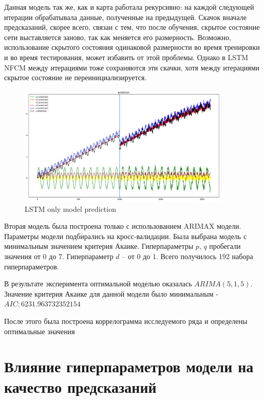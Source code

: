 Данная модель так же, как и карта работала рекурсивно:
на каждой следующей итерации обрабатывала данные, полученные на предыдущей.
Скачок вначале предсказаний, скорее всего, связан с тем, что после обучения,
скрытое состояние сети выставляется заново, так как меняется его размерность.
Возможно, использование скрытого состояния одинаковой размерности во время
тренировки и во время тестирования, может избавить от этой проблемы. Однако
в LSTM NFCM между итерациями тоже сохраняются эти скачки, хотя между итерациями
скрытое состояние не переинициализируется.

\begin{figure}
	\centering
	\includegraphics[width=0.9\textwidth]{./img/lstm_only_prediction.png}
	\caption{LSTM only model prediction}
	\label{pic:lstm_only_prediction}
\end{figure}


Вторая модель была построена только с использованием ARIMAX модели.
Параметры модели подбирались на кросс-валидации. Была выбрана модель с минимальным
значением критерия Акаике. Гиперпараметры $ p $, $ q $ пробегали значения от 0 до 7.
Гиперпараметр $ d $ -- от 0 до 1. Всего получилось 192 набора гиперпараметров.

В результате эксперимента оптимальной моделью оказалась $ ARIMA(5, 1, 5) $.
Значение критерия Акаике для данной модели было минимальным -~ $ AIC: 6231.963732352154 $





После этого была построена коррелограмма исследуемого ряда и определены оптимальные
значения 

\section{Влияние гиперпараметров модели на качество предсказаний}

